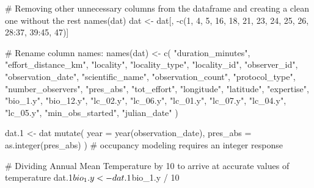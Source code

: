 \documentclass[]{article}
\newenvironment{Shaded}{}{}
\newcommand{\CommentTok}[1]{\textcolor[rgb]{0.00,0.50,0.00}{#1}}
\newcommand{\DataTypeTok}[1]{#1}
\newcommand{\DecValTok}[1]{#1}
\newcommand{\FloatTok}[1]{#1}
\newcommand{\KeywordTok}[1]{\textcolor[rgb]{0.00,0.00,1.00}{#1}}
\newcommand{\NormalTok}[1]{#1}
\newcommand{\OperatorTok}[1]{#1}
\newcommand{\StringTok}[1]{\textcolor[rgb]{0.00,0.50,0.50}{#1}}
\begin{document}
\begin{Shaded}
\begin{Highlighting}[]
{{{{{\CommentTok{# Removing other unnecessary columns from the dataframe and creating a clean one without the rest}
\KeywordTok{names}\NormalTok{(dat)}
\NormalTok{dat <-}\StringTok{ }\NormalTok{dat[, }\OperatorTok{-}\KeywordTok{c}\NormalTok{(}\DecValTok{1}\NormalTok{, }\DecValTok{4}\NormalTok{, }\DecValTok{5}\NormalTok{, }\DecValTok{16}\NormalTok{, }\DecValTok{18}\NormalTok{, }\DecValTok{21}\NormalTok{, }\DecValTok{23}\NormalTok{, }\DecValTok{24}\NormalTok{, }\DecValTok{25}\NormalTok{, }\DecValTok{26}\NormalTok{, }\DecValTok{28}\OperatorTok{:}\DecValTok{37}\NormalTok{, }\DecValTok{39}\OperatorTok{:}\DecValTok{45}\NormalTok{, }\DecValTok{47}\NormalTok{)]}

\CommentTok{# Rename column names:}
\KeywordTok{names}\NormalTok{(dat) <-}\StringTok{ }\KeywordTok{c}\NormalTok{(}
  \StringTok{"duration_minutes"}\NormalTok{, }\StringTok{"effort_distance_km"}\NormalTok{, }\StringTok{"locality"}\NormalTok{,}
  \StringTok{"locality_type"}\NormalTok{, }\StringTok{"locality_id"}\NormalTok{, }\StringTok{"observer_id"}\NormalTok{,}
  \StringTok{"observation_date"}\NormalTok{, }\StringTok{"scientific_name"}\NormalTok{, }\StringTok{"observation_count"}\NormalTok{,}
  \StringTok{"protocol_type"}\NormalTok{, }\StringTok{"number_observers"}\NormalTok{, }\StringTok{"pres_abs"}\NormalTok{, }\StringTok{"tot_effort"}\NormalTok{,}
  \StringTok{"longitude"}\NormalTok{, }\StringTok{"latitude"}\NormalTok{, }\StringTok{"expertise"}\NormalTok{, }\StringTok{"bio_1.y"}\NormalTok{, }\StringTok{"bio_12.y"}\NormalTok{,}
  \StringTok{"lc_02.y"}\NormalTok{, }\StringTok{"lc_06.y"}\NormalTok{, }\StringTok{"lc_01.y"}\NormalTok{, }\StringTok{"lc_07.y"}\NormalTok{, }\StringTok{"lc_04.y"}\NormalTok{,}
  \StringTok{"lc_05.y"}\NormalTok{, }\StringTok{"min_obs_started"}\NormalTok{, }\StringTok{"julian_date"}
\NormalTok{)}

\NormalTok{dat}\FloatTok{.1}\NormalTok{ <-}\StringTok{ }\NormalTok{dat }\OperatorTok{%
\StringTok{  }\KeywordTok{mutate}\NormalTok{(}
    \DataTypeTok{year =} \KeywordTok{year}\NormalTok{(observation_date),}
    \DataTypeTok{pres_abs =} \KeywordTok{as.integer}\NormalTok{(pres_abs)}
\NormalTok{  ) }\CommentTok{# occupancy modeling requires an integer response}

\CommentTok{# Dividing Annual Mean Temperature by 10 to arrive at accurate values of temperature}
\NormalTok{dat}\FloatTok{.1}\OperatorTok{$}\NormalTok{bio_}\FloatTok{1.}\NormalTok{y <-}\StringTok{ }\NormalTok{dat}\FloatTok{.1}\OperatorTok{$}\NormalTok{bio_}\FloatTok{1.}\NormalTok{y }\OperatorTok{/}\StringTok{ }\DecValTok{10}

}}}}}}
\end{Highlighting}
\end{Shaded}
\end{document}
